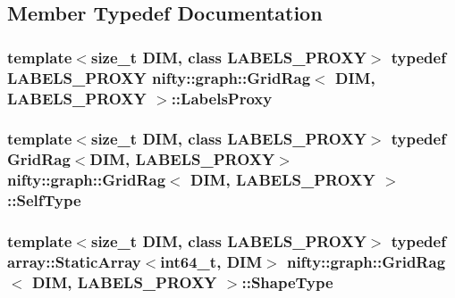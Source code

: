 \subsection{Member Typedef Documentation}
\hypertarget{classnifty_1_1graph_1_1GridRag_ad3146f72301da4f45b51e3b692776cf1}{}
\subsubsection[{Labels\+Proxy}]{\setlength{\rightskip}{0pt plus 5cm}template$<$size\+\_\+t D\+I\+M, class L\+A\+B\+E\+L\+S\+\_\+\+P\+R\+O\+X\+Y$>$ typedef L\+A\+B\+E\+L\+S\+\_\+\+P\+R\+O\+X\+Y {\bf nifty\+::graph\+::\+Grid\+Rag}$<$ D\+I\+M, L\+A\+B\+E\+L\+S\+\_\+\+P\+R\+O\+X\+Y $>$\+::{\bf Labels\+Proxy}}\label{classnifty_1_1graph_1_1GridRag_ad3146f72301da4f45b51e3b692776cf1}
\hypertarget{classnifty_1_1graph_1_1GridRag_aa5e47cff6ae70d13254abc3382b3b166}{}
\subsubsection[{Self\+Type}]{\setlength{\rightskip}{0pt plus 5cm}template$<$size\+\_\+t D\+I\+M, class L\+A\+B\+E\+L\+S\+\_\+\+P\+R\+O\+X\+Y$>$ typedef {\bf Grid\+Rag}$<$D\+I\+M, L\+A\+B\+E\+L\+S\+\_\+\+P\+R\+O\+X\+Y$>$ {\bf nifty\+::graph\+::\+Grid\+Rag}$<$ D\+I\+M, L\+A\+B\+E\+L\+S\+\_\+\+P\+R\+O\+X\+Y $>$\+::{\bf Self\+Type}}\label{classnifty_1_1graph_1_1GridRag_aa5e47cff6ae70d13254abc3382b3b166}
\hypertarget{classnifty_1_1graph_1_1GridRag_a3693e007e1419dec9751cca751a1061d}{}
\subsubsection[{Shape\+Type}]{\setlength{\rightskip}{0pt plus 5cm}template$<$size\+\_\+t D\+I\+M, class L\+A\+B\+E\+L\+S\+\_\+\+P\+R\+O\+X\+Y$>$ typedef {\bf array\+::\+Static\+Array}$<$int64\+\_\+t, D\+I\+M$>$ {\bf nifty\+::graph\+::\+Grid\+Rag}$<$ D\+I\+M, L\+A\+B\+E\+L\+S\+\_\+\+P\+R\+O\+X\+Y $>$\+::{\bf Shape\+Type}}\label{classnifty_1_1graph_1_1GridRag_a3693e007e1419dec9751cca751a1061d}
\hypertarget{classnifty_1_1graph_1_1GridRag_ae7dcf657b20ef49d062648978e192cdb}{}
